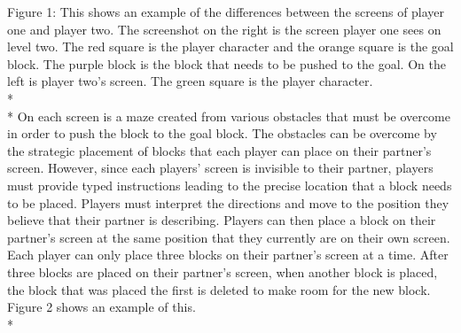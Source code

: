 Figure 1: This shows an example of the differences between the screens of player one and player two. The screenshot on the right is the screen player one sees on level two. The red square is the player character and the orange square is the goal block. The purple block is the block that needs to be pushed to the goal. On the left is player two’s screen. The green square is the player character.
\\*
\\*
On each screen is a maze created from various obstacles that must be overcome in order to push the block to the goal block. The obstacles can be overcome by the strategic placement of blocks that each player can place on their partner's screen. However, since each players' screen is invisible to their partner, players must provide typed instructions leading to the precise location that a block needs to be placed. Players must interpret the directions and move to the position they believe that their partner is describing. Players can then place a block on their partner's screen at the same position that they currently are on their own screen. Each player can only place three blocks on their partner's screen at a time. After three blocks are placed on their partner's screen, when another block is placed, the block that was placed the first is deleted to make room for the new block. Figure 2 shows an example of this.
\\*

